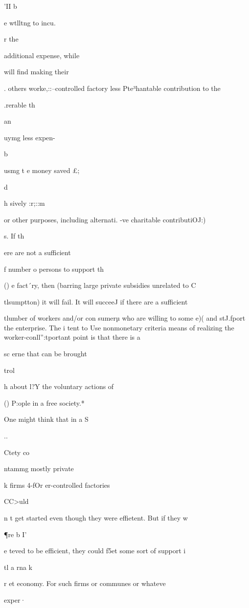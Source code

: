 \documentclass[11pt,openany]{book}
\begin{document}
'II b 

e wtlltng to incu. 

r the

additional expense, while 

will find making their 

. others worke,::--controlled factory less Pte³hantable contribution to the 

.rerable th 

an 

uymg less expen-

b 

usmg t e money saved £; 

d 

h sively :r;::m 

or other purposes, including alternati. -ve charitable contributiOJ:) 

s. If th 

ere are not a sufficient 

f number o persons to support th 

() e fact´ry, then (barring large private subsidies unrelated to C

tlsumptton) it will fail. It will succeeJ if there are a sufficient 

tlumber of workers and/or con sumerµ who are willing to some e)( and stJ.fport the enterprise. The i tent to Use nonmonetary criteria means of realizing the worker-conll'':tportant point is that there is a 

sc erne that can be brought 

trol 

h about l?Y the voluntary actions of 

() P:ople in a free society.* 

One might think that in a S

.. 

Ctety co 

ntammg mostly private 

k firms 4-fOr er-controlled factories 

CC>uld 

n t get started even though they were effietent. But if they w 

¶re b I' 

e teved to be efficient, they could f5et some sort of support i 

tl a rna k 

r et economy. For such firms or communes or whateve 

exper· 
\end{document}
